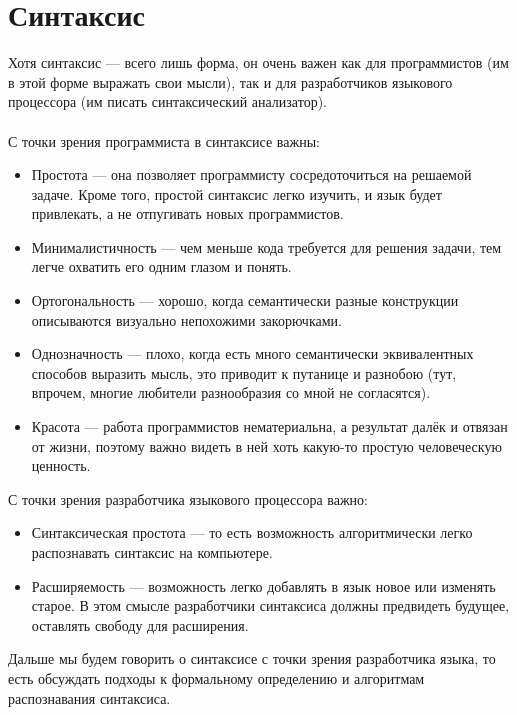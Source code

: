 \documentclass[11pt]{book}
\begin{document}
\section{Синтаксис}
Хотя синтаксис --- всего лишь форма, он очень важен как для программистов (им в этой форме выражать свои мысли),
так и для разработчиков языкового процессора (им писать синтаксический анализатор).
\\ \\
С точки зрения программиста в синтаксисе важны:
\begin{itemize}
\item Простота --- она позволяет программисту сосредоточиться на решаемой задаче.
Кроме того, простой синтаксис легко изучить, и язык будет привлекать, а не отпугивать новых программистов.
\item Минималистичность --- чем меньше кода требуется для решения задачи, тем легче охватить его одним глазом и понять.
\item Ортогональность --- хорошо, когда семантически разные конструкции описываются визуально непохожими закорючками.
\item Однозначность --- плохо, когда есть много семантически эквивалентных способов выразить мысль, это приводит к путанице и разнобою
(тут, впрочем, многие любители разнообразия со мной не согласятся).
\item Красота --- работа программистов нематериальна, а результат далёк и отвязан от жизни,
поэтому важно видеть в ней хоть какую-то простую человеческую ценность.
\end{itemize}
С точки зрения разработчика языкового процессора важно:
\begin{itemize}
\item Синтаксическая простота --- то есть возможность алгоритмически легко распознавать синтаксис на компьютере.
\item Расширяемость --- возможность легко добавлять в язык новое или изменять старое.
В этом смысле разработчики синтаксиса должны предвидеть будущее, оставлять свободу для расширения.
\end{itemize}
Дальше мы будем говорить о синтаксисе с точки зрения разработчика языка,
то есть обсуждать подходы к формальному определению и алгоритмам распознавания синтаксиса.
\end{document}

